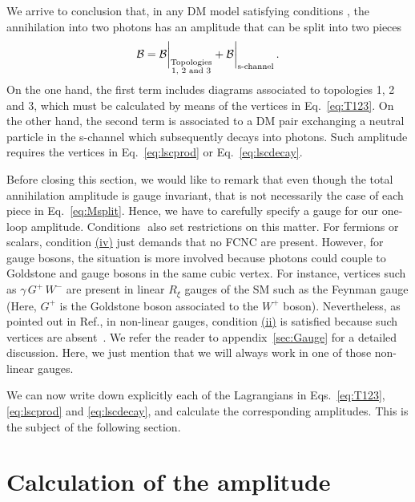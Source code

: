 We arrive to conclusion that, in any DM model satisfying conditions \cond, the annihilation into two photons has an  amplitude  that  can be split into two pieces
\begin{equation}
{\cal B} ={\cal B}\bigg|_{\substack{\text{Topologies}\\\text{1, 2 and 3}}}+{\cal B}\bigg|_\text{s-channel} \,.
\label{eq:Msplit}
\end{equation}  
On the one hand, the first term includes diagrams associated to topologies 1, 2 and 3, which must be calculated by means of the vertices in Eq.~\eqref{eq:T123}. On the other hand,  the second term  is associated to a DM pair exchanging a neutral particle in the s-channel which subsequently decays into photons. Such amplitude requires the vertices in Eq.~\eqref{eq:lscprod} or  Eq.~\eqref{eq:lscdecay}. 


Before closing this section, we would like to remark that
even though the total annihilation amplitude is gauge invariant, that is not necessarily  the case of each piece in Eq.~\eqref{eq:Msplit}. Hence, we have to carefully specify a gauge for our one-loop amplitude. Conditions \cond $ $ also set restrictions on this matter. For fermions or scalars, condition \hyperref[condition:iv]{(iv)} just demands that no FCNC are present. However, for gauge bosons, the situation is more involved because photons could couple to Goldstone and gauge bosons in the same cubic vertex. For instance,  vertices such as $\gamma \,G^+ \,W^-$  are present in linear $R_\xi$ gauges of the SM such as the Feynman gauge (Here, $G^+$ is the Goldstone boson associated to the $W^+$ boson). Nevertheless, as pointed out in Ref.\cite{Bergstrom:1997fh}, in non-linear gauges, condition \hyperref[condition:ii]{(ii)} is satisfied because such vertices are absent~\cite{Fujikawa:1973qs}. We refer the reader to appendix~\ref{sec:Gauge} for a detailed discussion. Here, we just mention that  we  will always work in one of those non-linear gauges.

We can now write down explicitly each of the Lagrangians in Eqs.~\eqref{eq:T123}, \eqref{eq:lscprod} and \eqref{eq:lscdecay}, and calculate the corresponding amplitudes. This is the subject of the following section.










\section{Calculation of the amplitude}
